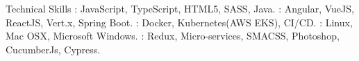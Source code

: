 \documentclass{resume}
\author{Rahmathullah M}
\begin{document}
\maketitle



\begin{category}{Technical Skills}
  : JavaScript, TypeScript, HTML5, SASS, Java.
  : Angular, VueJS, ReactJS, Vert.x, Spring Boot.
  : Docker, Kubernetes(AWS EKS), CI/CD.
  : Linux, Mac OSX, Microsoft Windows.
  : Redux, Micro-services, SMACSS, Photoshop, CucumberJs, Cypress.
\end{category} 

\end{document}
